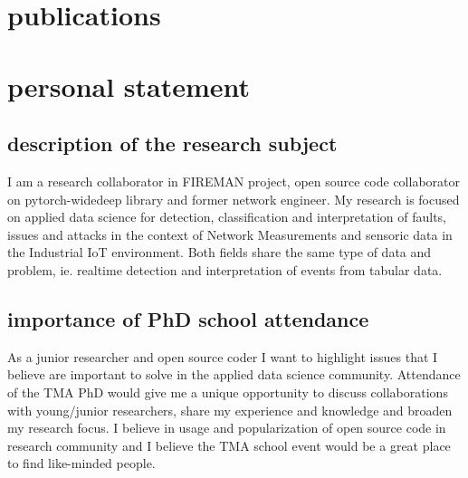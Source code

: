 \documentclass[]{friggeri-cv} %
\begin{document}
\section{publications}


\nocite{*}
\printbibliography[heading=none,sorting=chronological]

\pagebreak

\section{personal statement}
\subsection{description of the research subject}
I am a research collaborator in FIREMAN project, open source code collaborator on pytorch-widedeep library and former network engineer. My research is focused on applied data science for detection, classification and interpretation of faults, issues and attacks in the context of Network Measurements and sensoric data in the Industrial IoT environment. Both fields share the same type of data and problem, ie. realtime detection and interpretation of events from tabular data.

\subsection{importance of PhD school attendance}
As a junior researcher and open source coder I want to highlight issues that I believe are important to solve in the applied data science community. Attendance of the TMA PhD would give me a unique opportunity to discuss collaborations with young/junior researchers, share my experience and knowledge and broaden my research focus. I believe in usage and popularization of open source code in research community and I believe the TMA school event would be a great place to find like-minded people.
\end{document}
